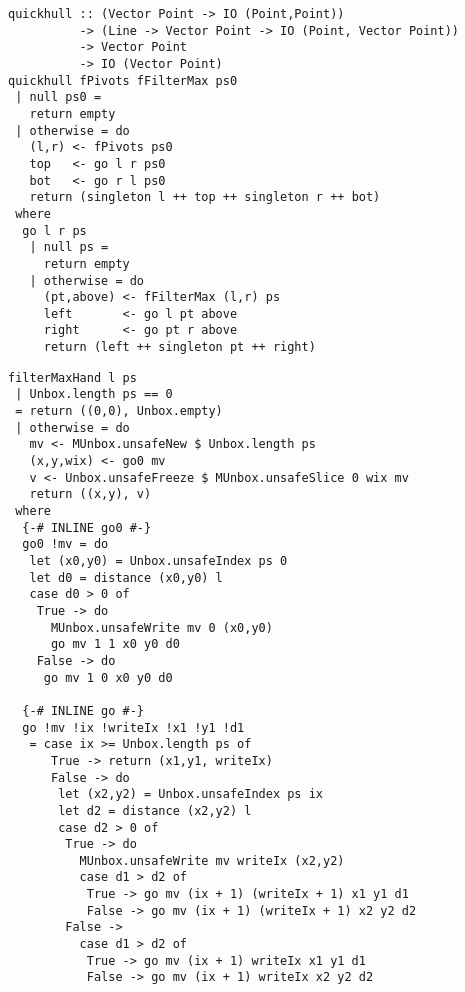 \begin{lstlisting}[float,label=l:a:bench:quickhull,caption=Quickhull skeleton parameterised by filterMax and pivots]
quickhull :: (Vector Point -> IO (Point,Point))
          -> (Line -> Vector Point -> IO (Point, Vector Point))
          -> Vector Point
          -> IO (Vector Point)
quickhull fPivots fFilterMax ps0
 | null ps0 =
   return empty
 | otherwise = do
   (l,r) <- fPivots ps0
   top   <- go l r ps0
   bot   <- go r l ps0
   return (singleton l ++ top ++ singleton r ++ bot)
 where
  go l r ps
   | null ps =
     return empty
   | otherwise = do
     (pt,above) <- fFilterMax (l,r) ps
     left       <- go l pt above
     right      <- go pt r above
     return (left ++ singleton pt ++ right)
\end{lstlisting}


\begin{lstlisting}[float,label=l:a:bench:filterMaxHand,caption=Hand-fused implementation of \Hs/filterMax/]
filterMaxHand l ps
 | Unbox.length ps == 0
 = return ((0,0), Unbox.empty)
 | otherwise = do
   mv <- MUnbox.unsafeNew $ Unbox.length ps
   (x,y,wix) <- go0 mv
   v <- Unbox.unsafeFreeze $ MUnbox.unsafeSlice 0 wix mv
   return ((x,y), v)
 where
  {-# INLINE go0 #-}
  go0 !mv = do
   let (x0,y0) = Unbox.unsafeIndex ps 0
   let d0 = distance (x0,y0) l
   case d0 > 0 of
    True -> do
      MUnbox.unsafeWrite mv 0 (x0,y0)
      go mv 1 1 x0 y0 d0
    False -> do
     go mv 1 0 x0 y0 d0

  {-# INLINE go #-}
  go !mv !ix !writeIx !x1 !y1 !d1
   = case ix >= Unbox.length ps of
      True -> return (x1,y1, writeIx)
      False -> do
       let (x2,y2) = Unbox.unsafeIndex ps ix
       let d2 = distance (x2,y2) l
       case d2 > 0 of
        True -> do
          MUnbox.unsafeWrite mv writeIx (x2,y2)
          case d1 > d2 of
           True -> go mv (ix + 1) (writeIx + 1) x1 y1 d1
           False -> go mv (ix + 1) (writeIx + 1) x2 y2 d2
        False ->
          case d1 > d2 of
           True -> go mv (ix + 1) writeIx x1 y1 d1
           False -> go mv (ix + 1) writeIx x2 y2 d2
\end{lstlisting}

